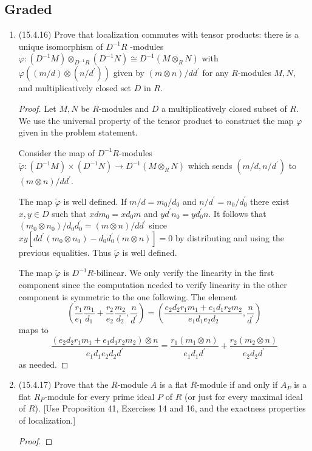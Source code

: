 \documentclass[11pt]{article}
\newcommand{\br}[1]{\left(#1\right)}
\begin{document}
\subsection*{Graded}
\begin{enumerate}
    \item (15.4.16) Prove that localization commutes with tensor products: there is a unique isomorphism of $D^{-1}R$ -modules $\varphi\colon (D^{-1}M)\otimes_{D^{-1}R} (D^{-1}N)\cong D^{-1}(M\otimes_R N)$ with $\varphi((m/d)\otimes(n/d^\prime))$ given by $(m\otimes n)/dd^\prime$ for any $R$-modules $M,N$, and multiplicatively closed set $D$ in $R$. \begin{proof}
        Let $M,N$ be $R$-modules and $D$ a multiplicatively closed subset of $R$. We use the universal property of the tensor product to construct the map $\varphi$ given in the problem statement. 

        Consider the map of $D^{-1}R$-modules $\tilde{\varphi}\colon (D^{-1}M)\times (D^{-1}N)\to D^{-1}(M\otimes_R N)$ which sends $(m/d,n/d^\prime)$ to $(m\otimes n)/dd^\prime$.
        
        The map $\tilde{\varphi}$ is well defined. If $m/d = m_0/d_0$ and $n/d^\prime = n_0/d^\prime_0$ there exist $x,y\in D$ such that $xdm_0 = xd_0m$ and $yd^\prime n_0 = yd^\prime_0n$. It follows that $(m_0\otimes n_0)/d_0d_0^\prime = (m\otimes n)/dd^\prime$ since $xy[dd^\prime(m_0\otimes n_0) - d_0d_0^\prime(m\otimes n)] = 0$ by distributing and using the previous equalities. Thus $\tilde{\varphi}$ is well defined. 

        The map $\tilde{\varphi}$ is $D^{-1}R$-bilinear. We only verify the linearity in the first component since the computation needed to verify linearity in the other component is symmetric to the one following. The element \[\br{\frac{r_1}{e_1}\frac{m_1}{d_1}+\frac{r_2}{e_2}\frac{m_2}{d_2},\frac{n}{d^\prime}} = \br{\frac{e_2d_2r_1m_1 + e_1d_1r_2m_2}{e_1d_1e_2d_2},\frac{n}{d^\prime}}\] maps to \[\frac{(e_2d_2r_1m_1 + e_1d_1r_2m_2)\otimes n}{e_1d_1e_2d_2d^\prime} = \frac{r_1(m_1\otimes n)}{e_1d_1d^\prime} + \frac{r_2(m_2\otimes n)}{e_2d_2d^\prime}\] as needed.
    \end{proof}
    \item (15.4.17) Prove that the $R$-module $A$ is a flat $R$-module if and only if $A_P$ is a flat $R_P$-module for every prime ideal $P$ of $R$ (or just for every maximal ideal of $R$). [Use Proposition 41, Exercises 14 and 16, and the exactness properties of localization.] \begin{proof}
        
    \end{proof}
\end{enumerate}
\end{document}

